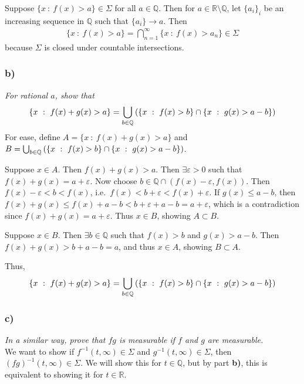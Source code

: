 \documentclass[12pt]{article}
\newcommand{\E}{\varepsilon}
\theoremstyle{plain}
\begin{document}
Suppose $\{x\ :\ f(x) > a\} \in \Sigma$ for all $a \in \mathbb{Q}$.  Then for $a \in \mathbb{R} \setminus \mathbb{Q}$, let $\{a_i\}_i$ be an increasing sequence in $\mathbb{Q}$ such that $\{a_i\} \rightarrow a$.  Then
\begin{align*}
    \{x\ :\ f(x) > a\} = \bigcap_{n=1}^\infty\{x\ :\ f(x) > a_n\} \in \Sigma
\end{align*}
because $\Sigma$ is closed under countable intersections.

\subsubsection*{ b)}
\emph{For rational $a$, show that}
\begin{align*}
    \{x\ :\ f(x) + g(x) > a\} = \bigcup_{b \in \mathbb{Q}} \qty(\{x\ :\ f(x) > b\} \cap \{x\ :\ g(x) > a - b\})
\end{align*}
For ease, define $A = \{x\ :\ f(x) + g(x) > a\}$ and $B = \bigcup_{b \in \mathbb{Q}} \qty(\{x\ :\ f(x) > b\} \cap \{x\ :\ g(x) > a - b\})$.

Suppose $x \in A$.  Then $f(x) + g(x) > a$.  Then $\exists \E > 0$ such that $f(x) + g(x) = a + \E$.  Now choose $b \in \mathbb{Q}\cap(f(x) - \E, f(x))$.  Then $f(x) - \E < b < f(x)$, i.e.~$f(x) < b + \E < f(x) + \E$.  If $g(x) \leq a - b$, then $f(x) + g(x) \leq f(x) + a - b < b + \E + a - b = a + \E$, which is a contradiction since $f(x) + g(x) = a + \E$.  Thus $x \in B$, showing $A \subset B$.

Suppose $x \in B$.  Then $\exists b \in \mathbb{Q}$ such that $f(x) > b$ and $g(x) > a - b$.  Then $f(x) + g(x) > b + a - b = a$, and thus $x \in A$, showing $B \subset A$.

Thus,
\begin{align*}
    \{x\ :\ f(x) + g(x) > a\} = \bigcup_{b \in \mathbb{Q}} \qty(\{x\ :\ f(x) > b\} \cap \{x\ :\ g(x) > a - b\})
\end{align*}

\subsubsection*{ c)}
\emph{In a similar way, prove that $fg$ is measurable if $f$ and $g$ are measurable.} \\

We want to show if $f^{-1}(t, \infty) \in \Sigma$ and $g^{-1}(t, \infty) \in \Sigma$, then $(fg)^{-1}(t, \infty) \in \Sigma$.  We will show this for $t \in \mathbb{Q}$, but by part \textbf{b)}, this is equivalent to showing it for $t \in \mathbb{R}$.
\end{document}
